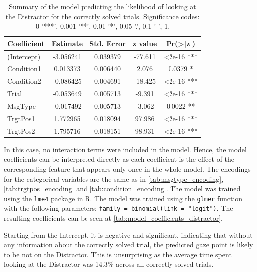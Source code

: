 \begin{table}[h!]
\centering
\begin{tabular}{|l|c|c|c|c|}
\hline
\textbf{Coefficient} & \textbf{Estimate} & \textbf{Std. Error} & \textbf{z value} & \textbf{Pr(>|z|)} \\ \hline
(Intercept)          & -3.056241         & 0.039379            & -77.611          & <2e-16 ***        \\ \hline
Condition1           & 0.013373          & 0.006440            & 2.076            & 0.0379 *          \\ \hline
Condition2           & -0.086425         & 0.004691            & -18.425          & <2e-16 ***        \\ \hline
Trial                & -0.053649         & 0.005713            & -9.391           & <2e-16 ***        \\ \hline
MsgType             & -0.017492         & 0.005713            & -3.062           & 0.0022 **         \\ \hline
TrgtPos1             & 1.772965          & 0.018094            & 97.986           & <2e-16 ***        \\ \hline
TrgtPos2             & 1.795716          & 0.018151            & 98.931           & <2e-16 ***        \\ \hline
\end{tabular}
\caption{Summary of the model predicting the likelihood of looking at the Distractor for the correctly solved trials. Significance codes: 0 '***', 0.001 '**', 0.01 '*', 0.05 '.', 0.1 ' ', 1.}
\label{tab:model_coefficients_distractor}
\end{table}

In this case, no interaction terms were included in the model. Hence, the model coefficients can be interpreted directly as each coefficient is the effect of the corresponding feature that appears only once in the whole model. The encodings for the categorical variables are the same as in \autoref{tab:msgtype_encoding}, \autoref{tab:trgtpos_encoding} and \autoref{tab:condition_encoding}. The model was trained using the \texttt{lme4} package in R. The model was trained using the \texttt{glmer} function with the following parameters: \texttt{family = binomial(link = "logit")}. The resulting coefficients can be seen at \autoref{tab:model_coefficients_distractor}.

Starting from the Intercept, it is negative and significant, indicating that without any information about the correctly solved trial, the predicted gaze point is likely to be not on the Distractor. This is unsurprising as the average time spent looking at the Distractor was 14.3\% across all correctly solved trials. 

